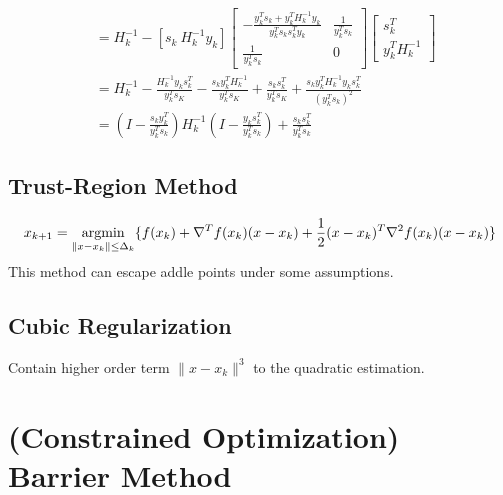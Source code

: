 \documentclass[11pt,a4paper]{article}
\newcommand{\argmin}{\operatornamewithlimits{argmin}}
\begin{document}
\begin{equation}
\begin{aligned}
        &=H_k^{-1}-[s_k\ H_k^{-1}y_k]\begin{bmatrix}
            -\frac{y_k^Ts_k+y^T_kH_k^{-1}y_k}{y_k^Ts_ks_k^Ty_k}&\frac{1}{y_k^Ts_k}\\
            \frac{1}{y_k^Ts_k}&0
        \end{bmatrix}\begin{bmatrix}
            s_k^T\\
            y_k^TH_k^{-1}
        \end{bmatrix}\\
        &=H_k^{-1}-\frac{H_k^{-1}y_ks^T_k}{y_k^Ts_K}-\frac{s_ky^T_kH_k^{-1}}{y_k^Ts_K}+\frac{s_ks_k^T}{y_k^Ts_K}+\frac{s_ky_k^TH_k^{-1}y_ks_k^T}{(y_k^Ts_k)^2}\\
        &=\left(I-\frac{s_ky_k^T}{y^T_ks_k}\right)H_k^{-1}\left(I-\frac{y_ks_k^T}{y^T_ks_k}\right)+\frac{s_ks_k^T}{y^T_ks_k}
    \end{aligned}
    \nonumber
\end{equation}
\begin{center}
\end{center}

\subsection{Trust-Region Method}
\begin{equation}
    \begin{aligned}
        x_{k+1}=\argmin_{\|x-x_k\|\leq\Delta_k}\{f(x_k)+\nabla^T f(x_k)(x-x_k)+\frac{1}{2}(x-x_k)^T \nabla^2 f(x_k) (x-x_k)\}
    \end{aligned}
    \nonumber
\end{equation}
This method can escape addle points under some assumptions.

\subsection{Cubic Regularization}
Contain higher order term $\|x-x_k\|^3$ to the quadratic estimation.


\section{(Constrained Optimization) Barrier Method}
\end{document}
